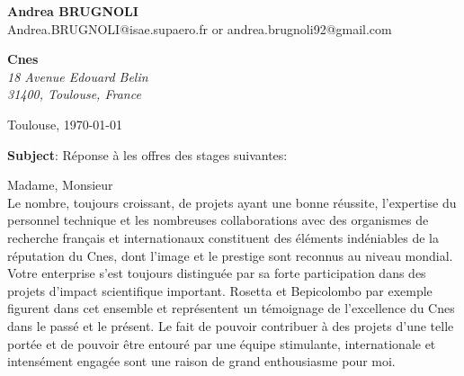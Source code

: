 \documentclass[11pt]{letter}
\begin{document}
 \sffamily
 \begin{flushleft}
 {\bfseries Andrea \textsc{BRUGNOLI}}\\[.35ex]
 Andrea.BRUGNOLI@isae.supaero.fr or andrea.brugnoli92@gmail.com
 \end{flushleft}
 \begin{flushright}
 {\bfseries Cnes}\\[.35ex]
 \small\itshape
 18 Avenue Edouard Belin\\
 31400, Toulouse, France
 \end{flushright}
 \begin{flushright}
 Toulouse, \today 
 \end{flushright}
 \textbf{Subject}: Réponse à les offres des stages suivantes:

Madame, Monsieur \\
Le nombre, toujours croissant, de projets ayant une bonne réussite, l'expertise du personnel technique et les nombreuses collaborations avec des organismes de recherche français et internationaux constituent  des éléments indéniables de la réputation du Cnes, dont l'image et le prestige sont reconnus au niveau mondial. Votre enterprise s'est toujours distinguée par sa forte participation dans des projets d'impact scientifique important. Rosetta et Bepicolombo par exemple figurent dans cet ensemble et représentent un témoignage de l'excellence du Cnes dans le passé et le présent. Le fait de pouvoir contribuer à des projets d'une telle portée et de pouvoir être entouré par une équipe stimulante, internationale et intensément engagée sont une raison de grand enthousiasme pour moi. 
\end{document}
